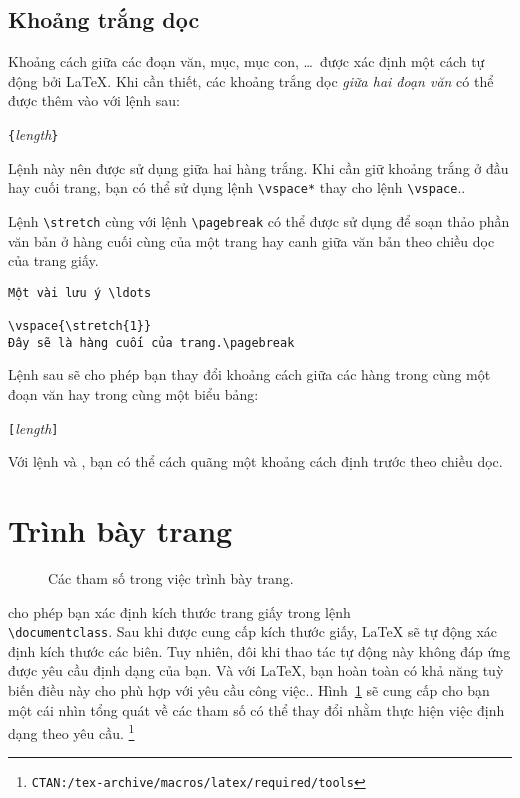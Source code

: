 \subsection{Khoảng trắng dọc}
Khoảng cách giữa các đoạn văn, mục, mục con, \ldots\ được xác định
một cách tự động bởi \LaTeX{}. Khi cần thiết, các khoảng trắng dọc
\emph{giữa hai đoạn văn} có thể được thêm vào với lệnh sau:

\begin{lscommand}
\verb|{|\emph{length}\verb|}|
\end{lscommand}
Lệnh này nên được sử dụng giữa hai hàng trắng. Khi cần giữ khoảng
trắng ở đầu hay cuối trang, bạn có thể sử dụng lệnh
\verb|\vspace*| thay cho lệnh \verb|\vspace|..

Lệnh \verb|\stretch| cùng với lệnh \verb|\pagebreak| có thể được
sử dụng để soạn thảo phần văn bản ở hàng cuối cùng của một trang
hay canh giữa văn bản theo chiều dọc của trang giấy.
\begin{code}
\begin{verbatim}
Một vài lưu ý \ldots

\vspace{\stretch{1}}
Đây sẽ là hàng cuối của trang.\pagebreak
\end{verbatim}
\end{code}

Lệnh sau sẽ cho phép bạn thay đổi khoảng cách giữa các hàng trong
cùng một đoạn văn hay trong cùng một biểu bảng:

\begin{lscommand}
\ci{\bs}\verb|[|\emph{length}\verb|]|
\end{lscommand}
Với lệnh  và , bạn có thể cách quãng một
khoảng cách định trước theo chiều dọc.

\section{Trình bày trang}
\begin{figure}[!hp]
\begin{center}
\makeatletter\@layout\makeatother
\end{center}
\vspace*{1.8cm} \caption{Các tham số trong việc trình bày trang.}
\label{fig:layout}
\end{figure}

\LaTeXe{} cho phép bạn xác định kích thước trang giấy trong lệnh \\
\verb|\documentclass|. Sau khi được cung cấp kích thước giấy,
\LaTeX{} sẽ tự động xác định kích thước các biên. Tuy nhiên, đôi
khi thao tác tự động này không đáp ứng được yêu cầu định dạng của
bạn. Và với \LaTeX{}, bạn hoàn toàn có khả năng tuỳ biến điều này
cho phù hợp với yêu cầu công việc.\thispagestyle{fancyplain}.
Hình~\ref{fig:layout} sẽ cung cấp cho bạn một cái nhìn tổng quát
về các tham số có thể thay đổi nhằm thực hiện việc định dạng theo
yêu cầu.%
\footnote{\texttt{CTAN:/tex-archive/macros/latex/required/tools}}

